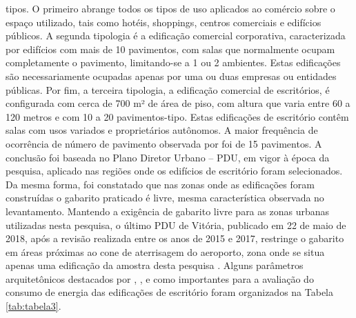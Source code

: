 tipos. O primeiro abrange todos os tipos de uso aplicados ao comércio sobre o espaço 
utilizado, tais como hotéis, shoppings, centros comerciais e edifícios públicos. A 
segunda tipologia é a edificação comercial corporativa, caracterizada por edifícios com 
mais de 10 pavimentos, com salas que normalmente ocupam completamente o pavimento, 
limitando-se a 1 ou 2 ambientes. Estas edificações são necessariamente ocupadas apenas 
por uma ou duas empresas ou entidades públicas. Por fim, a terceira tipologia, a 
edificação comercial de escritórios, é configurada com cerca de 700 m² de área de piso, 
com altura que varia entre 60 a 120 metros e com 10 a 20 pavimentos-tipo. Estas 
edificações de escritório contêm salas com usos variados e proprietários autônomos.\vspace*{0.3cm}\newline
A maior frequência de ocorrência de número de pavimento observada por \textcite{Bernabe2012}
foi de 15 pavimentos. A conclusão foi baseada no Plano Diretor Urbano – PDU, em 
vigor à época da pesquisa, aplicado nas regiões onde os edifícios de escritório 
foram selecionados. Da mesma forma, foi constatado que nas zonas onde as edificações 
foram construídas o gabarito praticado é livre, mesma característica observada no 
levantamento. Mantendo a exigência de gabarito livre para as zonas urbanas utilizadas 
nesta pesquisa, o último PDU de Vitória, publicado em 22 de maio de 2018, após a 
revisão realizada entre os anos de 2015 e 2017, restringe o gabarito em áreas 
próximas ao cone de aterrisagem do aeroporto, zona onde se situa apenas uma 
edificação da amostra desta pesquisa \cite{PrefeituraMunicipaldeVitoria-PMV2018}.\vspace*{0.3cm}\newline
Alguns parâmetros arquitetônicos destacados por \textcite{Lamberts2006}, 
\textcite{Bernabe2012}, e \textcite{Fonseca2016} como importantes para a avaliação do 
consumo de energia das edificações de escritório foram organizados na Tabela \ref{tab:tabela3}.\pagebreak
